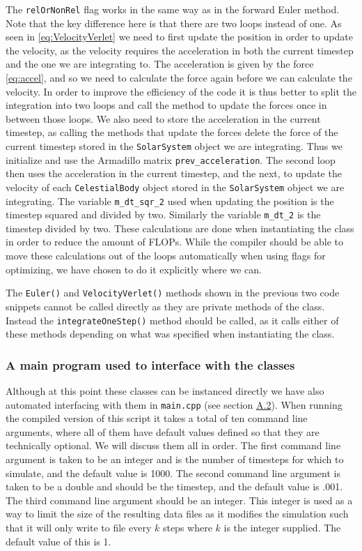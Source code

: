 \documentclass[reprint,english,notitlepage]{revtex4-1}  %
\begin{document}
The \verb+relOrNonRel+ flag works in the same way as in the forward Euler method. Note that the key difference here is that there are two loops instead of one. As seen in \eqref{eq:VelocityVerlet} we need to first update the position in order to update the velocity, as the velocity requires the acceleration in both the current timestep and the one we are integrating to. The acceleration is given by the force \eqref{eq:accel}, and so we need to calculate the force again before we can calculate the velocity. In order to improve the efficiency of the code it is thus better to split the integration into two loops and call the method to update the forces once in between those loops. We also need to store the acceleration in the current timestep, as calling the methods that update the forces delete the force of the current timestep stored in the \verb+SolarSystem+ object we are integrating. Thus we initialize and use the Armadillo \citep{Armadillo} matrix \verb+prev_acceleration+. The second loop then uses the acceleration in the current timestep, and the next, to update the velocity of each \verb+CelestialBody+ object stored in the \verb+SolarSystem+ object we are integrating. The variable \verb+m_dt_sqr_2+ used when updating the position is the timestep squared and divided by two. Similarly the variable \verb+m_dt_2+ is the timestep divided by two. These calculations are done when instantiating the class in order to reduce the amount of FLOPs. While the compiler should be able to move these calculations out of the loops automatically when using flags for optimizing, we have chosen to do it explicitly where we can.

The \verb+Euler()+ and \verb+VelocityVerlet()+ methods shown in the previous two code snippets cannot be called directly as they are private methods of the class. Instead the \verb+integrateOneStep()+ method should be called, as it calls either of these methods depending on what was specified when instantiating the class.


\subsubsection{A main program used to interface with the classes} \label{sec:III:a:4}

Although at this point these classes can be instanced directly we have also automated interfacing with them in \verb+main.cpp+ (see section \hyperref[A.2]{A.2}). When running the compiled version of this script it takes a total of ten command line arguments, where all of them have default values defined so that they are technically optional. We will discuss them all in order. The first command line argument is taken to be an integer and is the number of timesteps for which to simulate, and the default value is 1000. The second command line argument is taken to be a double and should be the timestep, and the default value is .001. The third command line argument should be an integer. This integer is used as a way to limit the size of the resulting data files as it modifies the simulation such that it will only write to file every $k$ steps where $k$ is the integer supplied. The default value of this is 1.
\end{document}
